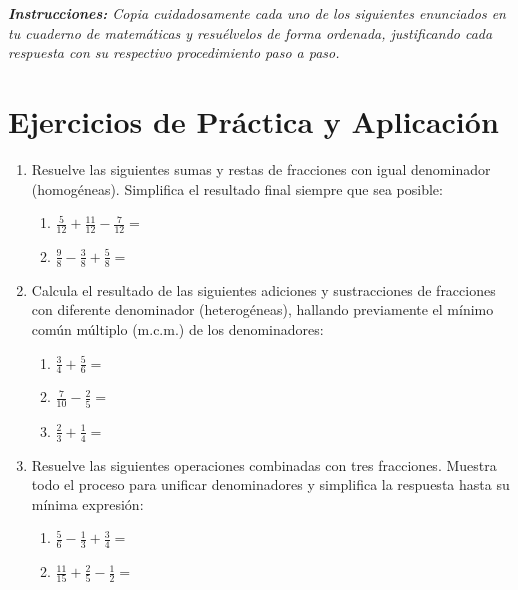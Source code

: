 \documentclass[12pt, letterpaper]{article}
\begin{document}
	\noindent \textit{\textbf{Instrucciones:} Copia cuidadosamente cada uno de los siguientes enunciados en tu cuaderno de matemáticas y resuélvelos de forma ordenada, justificando cada respuesta con su respectivo procedimiento paso a paso.}
	\vspace{0.6cm}
	
	\section*{Ejercicios de Práctica y Aplicación}
	
	\begin{enumerate}[itemsep=0.8cm]
		
		\item Resuelve las siguientes sumas y restas de fracciones con igual denominador (homogéneas). Simplifica el resultado final siempre que sea posible:
		\begin{enumerate}[label=\alph*., itemsep=0.3cm, topsep=0.2cm]
			\item $\frac{5}{12} + \frac{11}{12} - \frac{7}{12} =$
			\item $\frac{9}{8} - \frac{3}{8} + \frac{5}{8} =$
		\end{enumerate}
		
		\item Calcula el resultado de las siguientes adiciones y sustracciones de fracciones con diferente denominador (heterogéneas), hallando previamente el mínimo común múltiplo (m.c.m.) de los denominadores:
		\begin{enumerate}[label=\alph*., itemsep=0.3cm, topsep=0.2cm]
			\item $\frac{3}{4} + \frac{5}{6} =$
			\item $\frac{7}{10} - \frac{2}{5} =$
			\item $\frac{2}{3} + \frac{1}{4} =$
		\end{enumerate}
		
		\item Resuelve las siguientes operaciones combinadas con tres fracciones. Muestra todo el proceso para unificar denominadores y simplifica la respuesta hasta su mínima expresión:
		\begin{enumerate}[label=\alph*., itemsep=0.3cm, topsep=0.2cm]
			\item $\frac{5}{6} - \frac{1}{3} + \frac{3}{4} =$
			\item $\frac{11}{15} + \frac{2}{5} - \frac{1}{2} =$
		\end{enumerate}
		

\end{enumerate}
\end{document}
